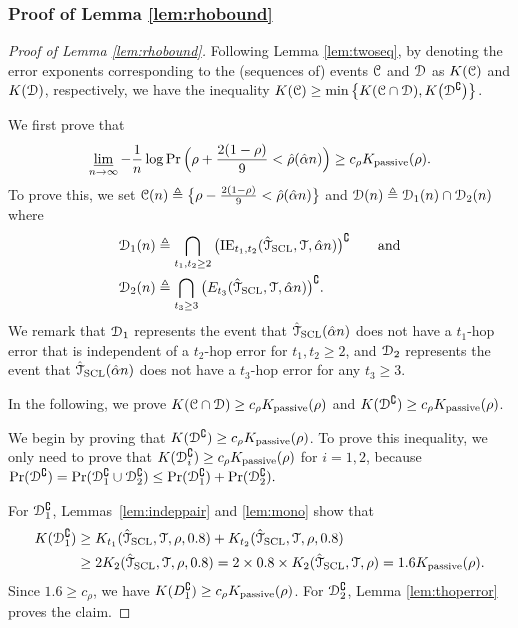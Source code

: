 \subsubsection{Proof of Lemma \ref{lem:rhobound}}
\begin{proof}[Proof of Lemma \ref{lem:rhobound}]
	Following Lemma \ref{lem:twoseq}, by denoting the error exponents corresponding to the (sequences of) events $ \mathcal{C}$ and $\mathcal{D}$ as $K ( \mathcal{C})$ and $K (\mathcal{D})$, respectively, we have  the inequality $K ( \mathcal{C})\geq \min\big\{K ( \mathcal{C}\cap \mathcal{D}),K \big(\mathcal{D}^{\complement}\big)\big\}$.
	
	We first prove  that
	\begin{align}
	    \varliminf_{n\rightarrow\infty}-\frac{1}{n}\log\Pr\Big(\rho+\frac{2(1-\rho)}{9}<\hat{\rho}(\hat{\alpha} n)\Big)\geq c_{\rho}K _{{\rm passive}}(\rho).
	\end{align}
	To prove this, we set $ \mathcal{C}(n)\triangleq\big\{\rho-\frac{2(1-\rho)}{9}<\hat{\rho}(\hat{\alpha} n)\big\}$ and $\mathcal{D}(n)\triangleq\mathcal{D}_{1}(n)\cap \mathcal{D}_{2}(n)$ where
	\begin{align}
		\mathcal{D}_{1}(n)&\triangleq\bigcap_{t_{1},t_{2}\geq 2} \big(\mathrm{IE}_{t_{1},t_{2}}(\hat{\mathcal{T}}_{{\rm SCL}},\mathcal{T},\hat{\alpha} n)\big)^{\complement}\qquad\mbox{and}\\
		\mathcal{D}_{2}(n)&\triangleq\bigcap_{t_{3}\geq 3}\big(E_{t_{3}}(\hat{\mathcal{T}}_{{\rm SCL}},\mathcal{T},\hat{\alpha} n)\big)^{\complement}.
	\end{align}
	We remark that $\mathcal{D}_{1}$ represents the event that $\hat{\mathcal{T}}_{\rm{SCL}}(\hat{\alpha} n)$  does not have a $t_{1}$-hop error that is independent of a $t_{2}$-hop error for $t_{1},t_{2}\geq 2$, and $\mathcal{D}_{2}$ represents  the event that $\hat{\mathcal{T}}_{\rm{SCL}}(\hat{\alpha} n)$ does not have a $t_3$-hop error for any $t_{3}\geq 3$.

	In the following, we   prove $K ( \mathcal{C}\cap \mathcal{D})\geq c_{\rho}K _{{\rm passive}}(\rho)$ and $K (\mathcal{D}^{\complement})\geq c_{\rho}K _{{\rm passive}}(\rho)$.

	We begin by proving that $K (\mathcal{D}^{\complement})\geq c_{\rho}K _{{\rm passive}}(\rho)$. To prove this inequality, we only need to prove that $K (\mathcal{D}_{i}^{\complement})\geq c_{\rho}K _{{\rm passive}}(\rho)$ for $i=1,2$, because $\Pr(\mathcal{D}^{\complement})=\Pr(\mathcal{D}_{1}^{\complement}\cup \mathcal{D}_{2}^{\complement})\leq \Pr(\mathcal{D}_{1}^{\complement})+\Pr(\mathcal{D}_{2}^{\complement}).$
	
	For $\mathcal{D}_{1}^{\complement}$, Lemmas~\ref{lem:indeppair} and \ref{lem:mono} show that 
	\begin{align}
		K (\mathcal{D}_{1}^{\complement})&\geq K _{t_{1}}(\hat{\mathcal{T}}_{\rm{SCL}},\mathcal{T},\rho,0.8)+K _{t_{2}}(\hat{\mathcal{T}}_{\rm{SCL}},\mathcal{T},\rho,0.8)\\
		&\geq 2K _{2}(\hat{\mathcal{T}}_{\rm{SCL}},\mathcal{T},\rho,0.8)
		= 2\times 0.8\times K _{2}(\hat{\mathcal{T}}_{\rm{SCL}},\mathcal{T},\rho)
		=1.6 K _{{\rm passive}}(\rho).
	\end{align}
	Since $1.6\geq c_{\rho}$, we have $K (D_{1}^{\complement})\geq c_{\rho}K _{{\rm passive}}(\rho)$. 	For $\mathcal{D}_{2}^{\complement}$, Lemma \ref{lem:thoperror} proves the claim.


\end{proof}
